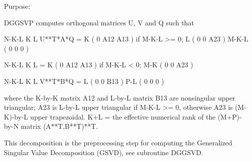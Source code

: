  \begin{DoxyParagraph}{Purpose\+: }
\begin{DoxyVerb} DGGSVP computes orthogonal matrices U, V and Q such that

                    N-K-L  K    L
  U**T*A*Q =     K ( 0    A12  A13 )  if M-K-L >= 0;
                 L ( 0     0   A23 )
             M-K-L ( 0     0    0  )

                  N-K-L  K    L
         =     K ( 0    A12  A13 )  if M-K-L < 0;
             M-K ( 0     0   A23 )

                  N-K-L  K    L
  V**T*B*Q =   L ( 0     0   B13 )
             P-L ( 0     0    0  )

 where the K-by-K matrix A12 and L-by-L matrix B13 are nonsingular
 upper triangular; A23 is L-by-L upper triangular if M-K-L >= 0,
 otherwise A23 is (M-K)-by-L upper trapezoidal.  K+L = the effective
 numerical rank of the (M+P)-by-N matrix (A**T,B**T)**T. 

 This decomposition is the preprocessing step for computing the
 Generalized Singular Value Decomposition (GSVD), see subroutine
 DGGSVD.\end{DoxyVerb}
 
\end{DoxyParagraph}

